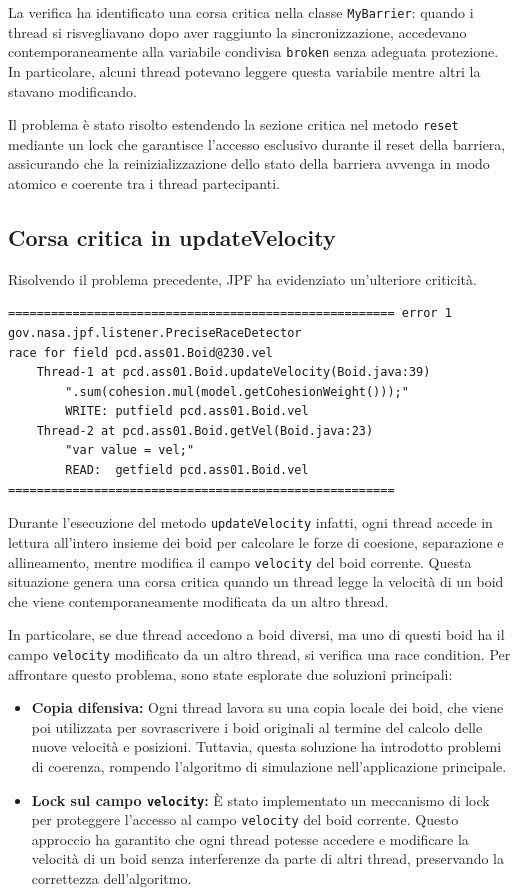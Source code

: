 \documentclass[a4paper,12pt]{report}
\begin{document}
La verifica ha identificato una corsa critica nella classe \texttt{MyBarrier}: quando i thread si risvegliavano dopo aver raggiunto la sincronizzazione, accedevano contemporaneamente alla variabile condivisa \texttt{broken} senza adeguata protezione. In particolare, alcuni thread potevano leggere questa variabile mentre altri la stavano modificando.

Il problema è stato risolto estendendo la sezione critica nel metodo \texttt{reset} mediante un lock che garantisce l'accesso esclusivo durante il reset della barriera, assicurando che la reinizializzazione dello stato della barriera avvenga in modo atomico e coerente tra i thread partecipanti.

\subsection{Corsa critica in updateVelocity}
Risolvendo il problema precedente, JPF ha evidenziato un'ulteriore criticità.

\begin{verbatim}
====================================================== error 1
gov.nasa.jpf.listener.PreciseRaceDetector
race for field pcd.ass01.Boid@230.vel
    Thread-1 at pcd.ass01.Boid.updateVelocity(Boid.java:39)
        ".sum(cohesion.mul(model.getCohesionWeight()));"  
        WRITE: putfield pcd.ass01.Boid.vel
    Thread-2 at pcd.ass01.Boid.getVel(Boid.java:23)
        "var value = vel;"  
        READ:  getfield pcd.ass01.Boid.vel
======================================================
\end{verbatim}

Durante l'esecuzione del metodo \texttt{updateVelocity} infatti, ogni thread accede in lettura all'intero insieme dei boid per calcolare le forze di coesione, separazione e allineamento, mentre modifica il campo \texttt{velocity} del boid corrente. Questa situazione genera una corsa critica quando un thread legge la velocità di un boid che viene contemporaneamente modificata da un altro thread.

In particolare, se due thread accedono a boid diversi, ma uno di questi boid ha il campo \texttt{velocity} modificato da un altro thread, si verifica una race condition. Per affrontare questo problema, sono state esplorate due soluzioni principali:

\begin{itemize}
    \item \textbf{Copia difensiva:} Ogni thread lavora su una copia locale dei boid, che viene poi utilizzata per sovrascrivere i boid originali al termine del calcolo delle nuove velocità e posizioni. Tuttavia, questa soluzione ha introdotto problemi di coerenza, rompendo l'algoritmo di simulazione nell'applicazione principale.
    \item \textbf{Lock sul campo \texttt{velocity}:} È stato implementato un meccanismo di lock per proteggere l'accesso al campo \texttt{velocity} del boid corrente. Questo approccio ha garantito che ogni thread potesse accedere e modificare la velocità di un boid senza interferenze da parte di altri thread, preservando la correttezza dell'algoritmo.
\end{itemize}
\end{document}
